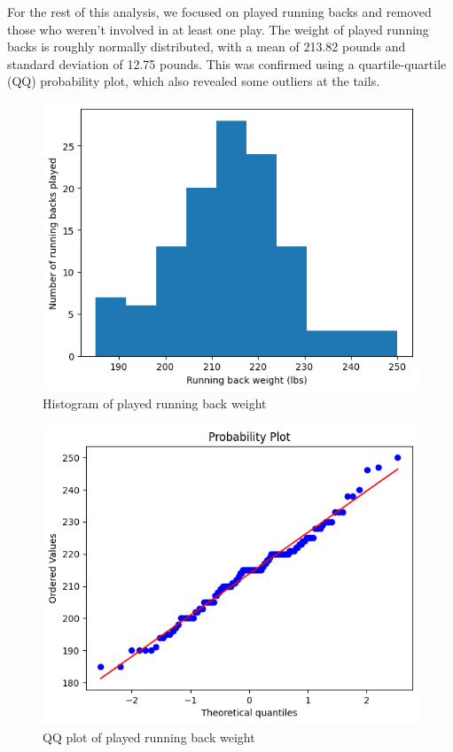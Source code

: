 \documentclass[bibtex, sigconf, hyperref={colorlinks=true,linkcolor=blue,urlcolor=blue}]{acmart}
\begin{document}
For the rest of this analysis, we focused on played running backs and removed
those who weren't involved in at least one play. The weight of played running
backs is roughly normally distributed, with a mean of 213.82 pounds and standard
deviation of 12.75 pounds. This was confirmed using a quartile-quartile (QQ)
probability plot, which also revealed some outliers at the tails.

\begin{figure}[h]
  \centering
  \includegraphics[width=\linewidth]{running-back-weight.png}
  \caption{Histogram of played running back weight}
\end{figure}

\begin{figure}[h]
  \centering
  \includegraphics[width=\linewidth]{running-back-weight-qq.png}
  \caption{QQ plot of played running back weight}
\end{figure}
\end{document}
